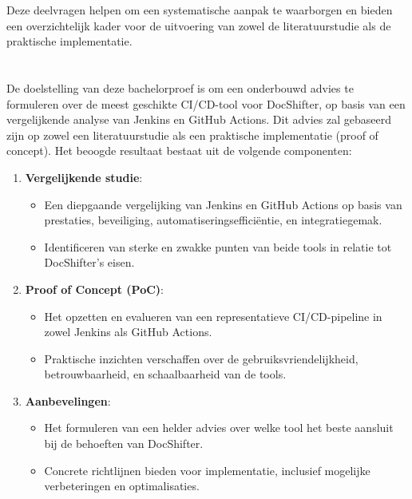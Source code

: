 Deze deelvragen helpen om een systematische aanpak te waarborgen en bieden een overzichtelijk kader voor de uitvoering van zowel de literatuurstudie als de praktische implementatie.
\section{}%
\label{sec:onderzoeksdoelstelling}

De doelstelling van deze bachelorproef is om een onderbouwd advies te formuleren over de meest geschikte CI/CD-tool voor DocShifter, op basis van een vergelijkende analyse van Jenkins en GitHub Actions. Dit advies zal gebaseerd zijn op zowel een literatuurstudie als een praktische implementatie (proof of concept). Het beoogde resultaat bestaat uit de volgende componenten:

\begin{enumerate}
    \item \textbf{Vergelijkende studie}:
    \begin{itemize}
        \item Een diepgaande vergelijking van Jenkins en GitHub Actions op basis van prestaties, beveiliging, automatiseringsefficiëntie, en integratiegemak.
        \item Identificeren van sterke en zwakke punten van beide tools in relatie tot DocShifter’s eisen.
    \end{itemize}
    \item \textbf{Proof of Concept (PoC)}:
    \begin{itemize}
        \item Het opzetten en evalueren van een representatieve CI/CD-pipeline in zowel Jenkins als GitHub Actions.
        \item Praktische inzichten verschaffen over de gebruiksvriendelijkheid, betrouwbaarheid, en schaalbaarheid van de tools.
    \end{itemize}
    \item \textbf{Aanbevelingen}:
    \begin{itemize}
        \item Het formuleren van een helder advies over welke tool het beste aansluit bij de behoeften van DocShifter.
        \item Concrete richtlijnen bieden voor implementatie, inclusief mogelijke verbeteringen en optimalisaties.
    \end{itemize}
\end{enumerate}

